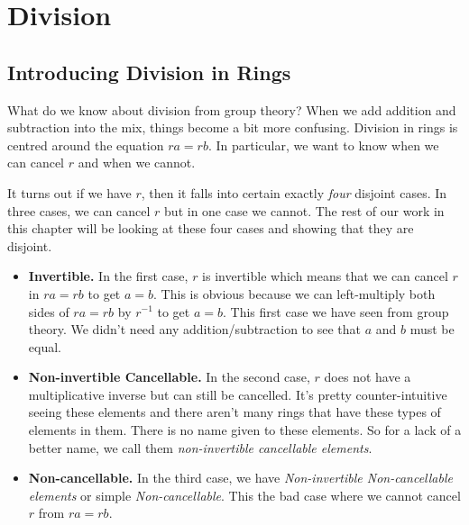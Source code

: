 
\chapter{Division}




\section{Introducing Division in Rings}

What do we know about division from group theory?
When we add addition and subtraction into the mix, things become a bit more confusing. 
Division in rings is centred around the equation $ra = rb$. In particular, we want to know 
when we can cancel $r$ and when we cannot. 

It turns out if we have $r$, then it falls into certain exactly \textit{four} disjoint cases. 
In three cases, we can cancel $r$ but in one case we cannot. The rest of our work in this chapter 
will be looking at these four cases and showing that they are disjoint.

\begin{itemize}	
\renewcommand{\labelitemi}{$\Box$}
\item \textbf{Invertible.} In the first case, $r$ is invertible which means that we can 
cancel $r$ in $ra = rb$ to get $a = b$. This is obvious because we can left-multiply 
both sides of $ra = rb$ by $r^{-1}$ to get $a =b$. This first case we have seen from group theory. We didn't 
need any addition/subtraction to see that $a$ and $b$ must be equal.
\item \textbf{Non-invertible Cancellable.} In the second case, $r$ does not have a multiplicative inverse 
but can still be cancelled. It's pretty counter-intuitive seeing these elements and there aren't many 
rings that have these types of elements in them. There is no name given to these elements. 
So for a lack of a better name, we call them \textit{non-invertible cancellable elements}.
\item \textbf{Non-cancellable.} In the third case, we have \textit{Non-invertible Non-cancellable elements} 
or simple \textit{Non-cancellable}. This the bad case where we cannot cancel $r$ from $ra = rb$. 
\end{itemize}




\begin{figure}[h]
\end{figure}



